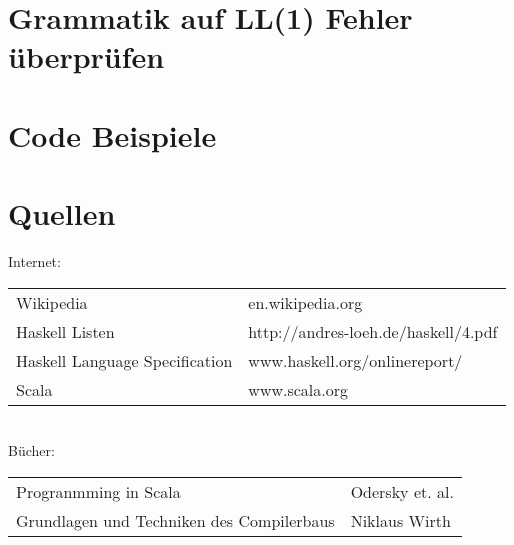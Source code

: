 \documentclass[a4paper,notitlepage,oneside]{scrartcl}
\begin{document}
\newpage
\section{Grammatik auf LL(1) Fehler überprüfen}

\newpage
\section{Code Beispiele}

\newpage
\section{Quellen}
Internet:\\
\begin{tabular}{l l}
Wikipedia & en.wikipedia.org \\
Haskell Listen  & http://andres-loeh.de/haskell/4.pdf \\
Haskell Language Specification & www.haskell.org/onlinereport/ \\
Scala & www.scala.org
\end{tabular} \\
Bücher: \\
\begin{tabular}{l l}
Progranmming in Scala & Odersky et. al. \\
Grundlagen und Techniken des Compilerbaus & Niklaus Wirth \\
\end{tabular}
\end{document}
